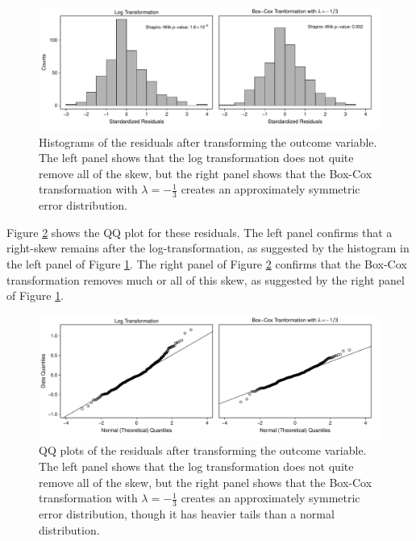 \documentclass[12pt]{article}
\begin{document}
\begin{figure}[H]
\begin{center}
\includegraphics[width = \textwidth]{figs/cg-trans-residuals-hist.pdf}
\caption{Histograms of the residuals after transforming the outcome variable. The left panel shows that the log transformation does not quite remove all of the skew, but the right panel shows that the Box-Cox transformation with $\lambda = -\frac{1}{3}$ creates an approximately symmetric error distribution.}\label{fig:cg-trans-residuals-hist}
\end{center}
\end{figure}

Figure \ref{fig:cg-trans-qq-plot} shows the QQ plot for these residuals. The left panel confirms that a right-skew remains after the log-transformation, as suggested by the histogram in the left panel of Figure \ref{fig:cg-trans-residuals-hist}. The right panel of Figure \ref{fig:cg-trans-qq-plot} confirms that the Box-Cox transformation removes much or all of this skew, as suggested by the right panel of Figure \ref{fig:cg-trans-residuals-hist}. 

\begin{figure}[H]
\begin{center}
\includegraphics[width = \textwidth]{figs/cg-trans-qq-plot.pdf}
\caption{QQ plots of the residuals after transforming the outcome variable. The left panel shows that the log transformation does not quite remove all of the skew, but the right panel shows that the Box-Cox transformation with $\lambda = -\frac{1}{3}$ creates an approximately symmetric error distribution, though it has heavier tails than a normal distribution.}\label{fig:cg-trans-qq-plot}
\end{center}
\end{figure}
\end{document}
